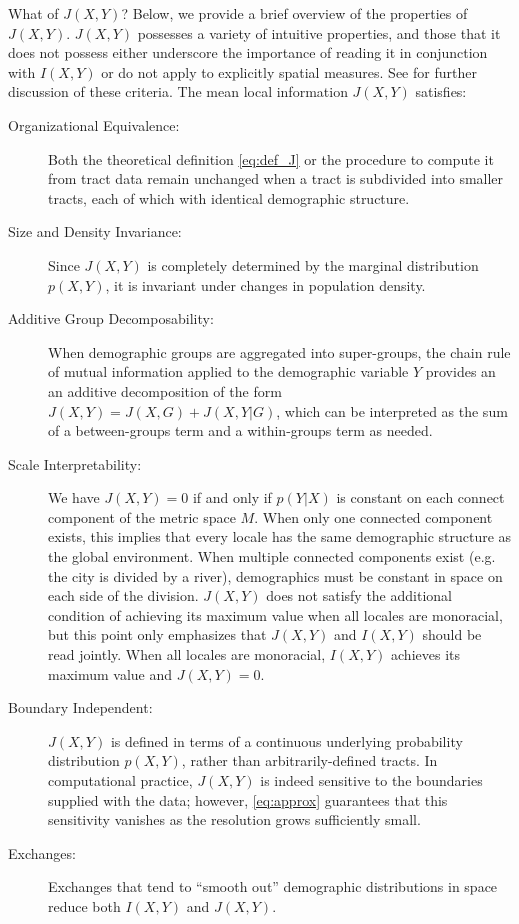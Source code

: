	What of $J(X,Y)$? Below, we provide a brief overview of the properties of $J(X,Y)$. $J(X,Y)$ possesses a variety of intuitive properties, and those that it does not possess either underscore the importance of reading it in conjunction with $I(X,Y)$ or do not apply to explicitly spatial measures.  See \cite{Reardon2002,Reardon2004} for further discussion of these criteria. The mean local information $J(X,Y)$ satisfies: 
	\begin{description}
		\item[Organizational Equivalence:] Both the theoretical definition \eqref{eq:def_J} or the procedure to compute it from tract data remain unchanged when a tract is subdivided into smaller tracts, each of which with identical demographic structure. 
		\item[Size and Density Invariance:] Since $J(X,Y)$ is completely determined by the marginal distribution $p(X,Y)$, it is invariant under changes in population density. 
		\item[Additive Group Decomposability:] When demographic groups are aggregated into super-groups, the chain rule of mutual information applied to the demographic variable $Y$ provides an an additive decomposition of the form $J(X,Y) = J(X,G) + J(X,Y|G)$, which can be interpreted as the sum of a between-groups term and a within-groups term as needed.   
		\item[Scale Interpretability:] We have $J(X,Y) = 0$ if and only if $p(Y|X)$ is constant on each connect component of the metric space $M$. When only one connected component exists, this implies that every locale has the same demographic structure as the global environment. When multiple connected components exist (e.g. the city is divided by a river), demographics must be constant in space on each side of the division. $J(X,Y)$ does not satisfy the additional condition of achieving its maximum value when all locales are monoracial, but this point only emphasizes that $J(X,Y)$ and $I(X,Y)$ should be read jointly. When all locales are monoracial, $I(X,Y)$ achieves its maximum value and $J(X,Y) = 0$. 
		\item[Boundary Independent:] $J(X,Y)$ is defined in terms of a continuous underlying probability distribution $p(X,Y)$, rather than arbitrarily-defined tracts. In computational practice, $J(X,Y)$ is indeed sensitive to the boundaries supplied with the data; however, \eqref{eq:approx} guarantees that this sensitivity vanishes as the resolution grows sufficiently small.  
		\item[Exchanges:] Exchanges that tend to ``smooth out'' demographic distributions in space reduce both $I(X,Y)$ and $J(X,Y)$.  
	\end{description}

